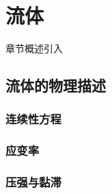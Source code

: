 \chapter{流体}\label{9}

章节概述引入

\section{流体的物理描述}\label{9-1}

\subsection{连续性方程}\label{9-1-1}

\subsection{应变率}\label{9-1-2}

\subsection{压强与黏滞}\label{9-1-3}